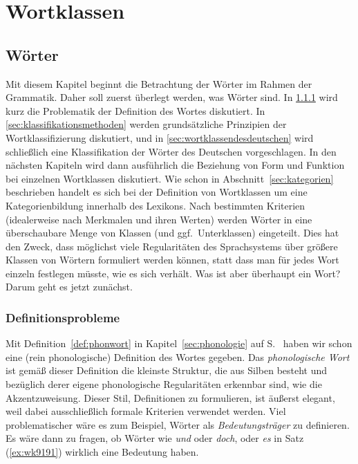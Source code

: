 \chapter{Wortklassen}

\label{sec:wortklassen}

\section{Wörter}

\label{sec:woerter}

Mit diesem Kapitel beginnt die Betrachtung der Wörter im Rahmen der Grammatik.
Daher soll zuerst überlegt werden, was Wörter sind.
In \ref{sec:definitionsproblemewort} wird kurz die Problematik der Definition des Wortes diskutiert.
In \ref{sec:klassifikationsmethoden} werden grundsätzliche Prinzipien der Wortklassifizierung diskutiert, und in \ref{sec:wortklassendesdeutschen} wird schließlich eine Klassifikation der Wörter des Deutschen vorgeschlagen.
In den nächsten Kapiteln wird dann ausführlich die Beziehung von Form und Funktion bei einzelnen Wortklassen diskutiert.
Wie schon in Abschnitt~\ref{sec:kategorien} beschrieben handelt es sich bei der Definition von Wortklassen um eine Kategorienbildung innerhalb des Lexikons.
Nach bestimmten Kriterien (idealerweise nach Merkmalen und ihren Werten) werden Wörter in eine überschaubare Menge von Klassen (und ggf.\ Unterklassen) eingeteilt.
Dies hat den Zweck, dass möglichst viele Regularitäten des Sprachsystems über größere Klassen von Wörtern formuliert werden können, statt dass man für jedes Wort einzeln festlegen müsste, wie es sich verhält.
Was ist aber überhaupt ein Wort?
Darum geht es jetzt zunächst.

\subsection{Definitionsprobleme}

\label{sec:definitionsproblemewort}


Mit Definition~\ref{def:phonwort} in Kapitel~\ref{sec:phonologie} auf S.~\pageref{def:phonwort} haben wir schon eine (rein phonologische) Definition des Wortes gegeben.
Das \textit{phonologische Wort} ist gemäß dieser Definition die kleinste Struktur, die aus Silben besteht und bezüglich derer eigene phonologische Regularitäten erkennbar sind, wie \zB die Akzentzuweisung.
Dieser Stil, Definitionen zu formulieren, ist äußerst elegant, weil dabei ausschließlich formale Kriterien verwendet werden.
Viel problematischer wäre es zum Beispiel, Wörter als \textit{Bedeutungsträger} zu definieren.
Es wäre dann zu fragen, ob Wörter wie \textit{und} oder \textit{doch}, oder \textit{es} in Satz (\ref{ex:wk9191}) wirklich eine Bedeutung haben.

